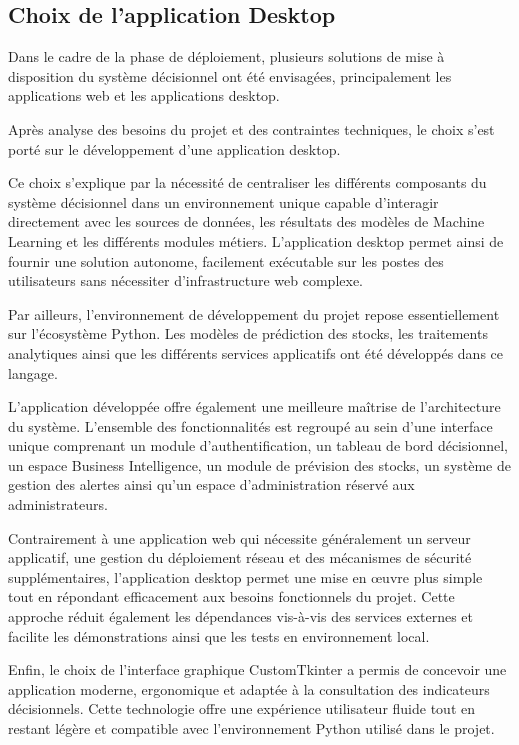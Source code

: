 \subsection{Choix de l'application Desktop}

Dans le cadre de la phase de déploiement, plusieurs solutions de mise à disposition du système décisionnel ont été envisagées, principalement les applications web et les applications desktop.

Après analyse des besoins du projet et des contraintes techniques, le choix s'est porté sur le développement d'une application desktop.

Ce choix s'explique par la nécessité de centraliser les différents composants du système décisionnel dans un environnement unique capable d'interagir directement avec les sources de données, les résultats des modèles de Machine Learning et les différents modules métiers. L'application desktop permet ainsi de fournir une solution autonome, facilement exécutable sur les postes des utilisateurs sans nécessiter d'infrastructure web complexe.

Par ailleurs, l'environnement de développement du projet repose essentiellement sur l'écosystème Python. Les modèles de prédiction des stocks, les traitements analytiques ainsi que les différents services applicatifs ont été développés dans ce langage.

L'application développée offre également une meilleure maîtrise de l'architecture du système. L'ensemble des fonctionnalités est regroupé au sein d'une interface unique comprenant un module d'authentification, un tableau de bord décisionnel, un espace Business Intelligence, un module de prévision des stocks, un système de gestion des alertes ainsi qu'un espace d'administration réservé aux administrateurs.

Contrairement à une application web qui nécessite généralement un serveur applicatif, une gestion du déploiement réseau et des mécanismes de sécurité supplémentaires, l'application desktop permet une mise en œuvre plus simple tout en répondant efficacement aux besoins fonctionnels du projet. Cette approche réduit également les dépendances vis-à-vis des services externes et facilite les démonstrations ainsi que les tests en environnement local.

Enfin, le choix de l'interface graphique CustomTkinter a permis de concevoir une application moderne, ergonomique et adaptée à la consultation des indicateurs décisionnels. Cette technologie offre une expérience utilisateur fluide tout en restant légère et compatible avec l'environnement Python utilisé dans le projet.


